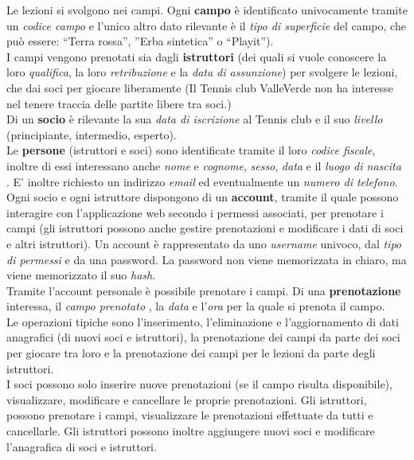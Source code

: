 Le lezioni si svolgono nei campi. Ogni \textbf{campo} è identificato univocamente tramite un \textit{codice campo} e l’unico altro dato rilevante è il \textit{tipo di superficie} del campo, che può essere: “Terra rossa”, ”Erba sintetica” o “Playit”). \\

I campi vengono prenotati sia dagli \textbf{istruttori} (dei quali si vuole conoscere la loro \textit{qualifica}, la loro \textit{retribuzione} e la \textit{data di assunzione}) per svolgere le lezioni, che dai soci per giocare liberamente (Il Tennis club ValleVerde non ha interesse nel tenere traccia delle partite libere tra soci.)\\

Di un \textbf{socio} è rilevante la sua \textit{data di iscrizione} al Tennis club e il suo \textit{livello} (principiante, intermedio, esperto).\\

Le \textbf{persone} (istruttori e soci) sono identificate tramite il loro \textit{codice fiscale}, inoltre di essi interessano anche \textit{nome} e \textit{cognome}, \textit{sesso}, \textit{data} e il \textit{luogo di nascita} . E’ inoltre richiesto un indirizzo \textit{email} ed eventualmente un \textit{numero di telefono}. \\

Ogni socio e ogni istruttore dispongono di un \textbf{account}, tramite il quale possono interagire con l’applicazione web secondo i permessi associati, per prenotare i campi (gli istruttori possono anche gestire prenotazioni e modificare i dati di soci e altri istruttori).
Un account è rappresentato da uno \textit{username} univoco, dal \textit{tipo di permessi} e da una password. La password non viene memorizzata in chiaro, ma viene memorizzato il suo \textit{hash}.\\

Tramite l’account personale è possibile prenotare i campi. Di una \textbf{prenotazione} interessa, il \textit{campo prenotato} , la \textit{data} e l'\textit{ora} per la quale si prenota il campo. \\

Le operazioni tipiche sono l’inserimento, l’eliminazione e l’aggiornamento di dati anagrafici (di nuovi soci e istruttori), la prenotazione dei campi da parte dei soci per giocare tra loro e la prenotazione dei campi per le lezioni da parte degli istruttori. \\

I soci possono solo inserire nuove prenotazioni (se il campo risulta disponibile), visualizzare, modificare e cancellare le proprie prenotazioni. 
Gli istruttori, possono prenotare i campi, visualizzare le prenotazioni effettuate da tutti e cancellarle.
Gli istruttori possono inoltre aggiungere nuovi soci e modificare l’anagrafica di soci e istruttori.

